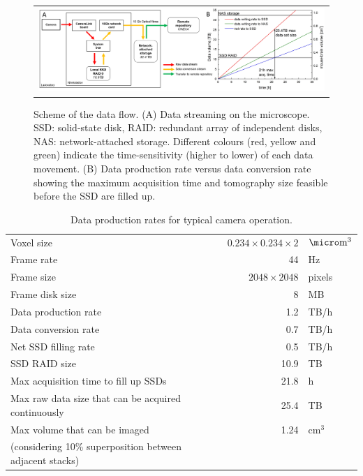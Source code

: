 \documentclass[12pt]{spieman}  %
\begin{document}
	\begin{figure}
   \begin{center}
   \begin{tabular}{c}
   \includegraphics[width=\textwidth]{DataFlow.eps}
   \end{tabular}
   \end{center}
   \caption{\label{fig:DataFlow} Scheme of the data flow. (A) Data streaming on the microscope. SSD: solid-state disk, RAID: redundant array of independent disks, NAS: network-attached storage. Different colours (red, yellow and green) indicate the time-sensitivity (higher to lower) of each data movement. (B) Data production rate versus data conversion rate showing the maximum acquisition time and tomography size feasible before the SSD are filled up.} 
   \end{figure}


\begin{table}%
	\centering
		\caption[Data production]{Data production rates for typical camera operation.\label{tab:dataproduction}}
		\begin{tabular}{lrl}
		\\
		Voxel size																								& $0.234 \times 0.234 \times 2$	& $\micro\text{m}^3$ 	\\
		Frame rate																								& 44														& Hz								\\
		Frame size																								& $2048 \times 2048$ 						& pixels						\\
		Frame disk size																						& 8									 						& MB								\\
		Data production rate																			& 1.2								 						& TB/h 							\\
		Data conversion rate																			& 0.7								 						& TB/h 							\\
		Net SSD filling rate																			& 0.5								 						& TB/h 							\\
		SSD RAID size																							& 10.9							 						& TB								\\
		Max acquisition time to fill up SSDs											& 21.8							 						& h									\\
		Max raw data size that can be acquired continuously				& 25.4							 						& TB								\\
		Max volume that can be imaged 														& 1.24							 						& $\text{cm}^3$ 		\\
		(considering 10\% superposition between adjacent stacks)	&										 						&										\\
		\end{tabular}
\end{table}
\end{document}
